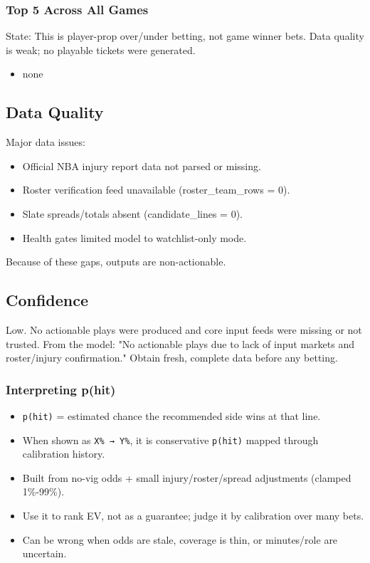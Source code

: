 \documentclass[10pt]{article}
\begin{document}
\subsubsection*{Top 5 Across All Games}

State: This is player-prop over/under betting, not game winner bets.
Data quality is weak; no playable tickets were generated.

\begin{itemize}
\item none
\end{itemize}

\newpage

\subsection*{Data Quality}
Major data issues:
\begin{itemize}
\item Official NBA injury report data not parsed or missing.
\item Roster verification feed unavailable (roster\_team\_rows = 0).
\item Slate spreads/totals absent (candidate\_lines = 0).
\item Health gates limited model to watchlist-only mode.
\end{itemize}
Because of these gaps, outputs are non-actionable.

\subsection*{Confidence}
Low. No actionable plays were produced and core input feeds were missing or not trusted. From the model: "No actionable plays due to lack of input markets and roster/injury confirmation." Obtain fresh, complete data before any betting.

\subsubsection*{Interpreting p(hit)}

\begin{itemize}
\item \texttt{p(hit)} = estimated chance the recommended side wins at that line.
\item When shown as \texttt{X\% → Y\%}, it is conservative \texttt{p(hit)} mapped through calibration history.
\item Built from no-vig odds + small injury/roster/spread adjustments (clamped 1\%-99\%).
\item Use it to rank EV, not as a guarantee; judge it by calibration over many bets.
\item Can be wrong when odds are stale, coverage is thin, or minutes/role are uncertain.
\end{itemize}
\end{document}
